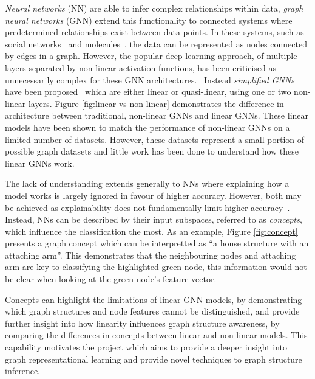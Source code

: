 \emph{Neural networks} (NN) are able to infer complex relationships within data, \emph{graph neural networks} (GNN) extend this functionality to connected systems where predetermined relationships exist between data points.
In these systems, such as social networks~\cite{pmlr-v70-gilmer17a} and molecules~\cite{DBLP:journals/corr/abs-1806-01973}, the data can be represented as nodes connected by edges in a graph.
However, the popular deep learning approach, of multiple layers separated by non-linear activation functions, has been criticised as unnecessarily complex for these GNN architectures.~\cite{wu2019simplifying}
Instead \emph{simplified GNNs} have been proposed~\cite{chanpuriya2022simplified,chien2020adaptive,wu2019simplifying} which are either linear or quasi-linear, using one or two non-linear layers.
Figure \ref{fig:linear-vs-non-linear} demonstrates the difference in architecture between traditional, non-linear GNNs and linear GNNs.
These linear models have been shown to match the performance of non-linear GNNs on a limited number of datasets.
However, these datasets represent a small portion of possible graph datasets and little work has been done to understand how these linear GNNs work.


The lack of understanding extends generally to NNs where explaining how a model works is largely ignored in favour of higher accuracy.
However, both may be achieved as explainability does not fundamentally limit higher accuracy~\cite{zarlenga2022concept}.
Instead, NNs can be described by their input subspaces, referred to as \emph{concepts}, which influence the classification the most.
As an example, Figure \ref{fig:concept} presents a graph concept which can be interpretted as ``a house structure with an attaching arm''.
This demonstrates that the neighbouring nodes and attaching arm are key to classifying the highlighted green node, this information would not be clear when looking at the green node's feature vector.

Concepts can highlight the limitations of linear GNN models, by demonstrating which graph structures and node features cannot be distinguished, and provide further insight into how linearity influences graph structure awareness, by comparing the differences in concepts between linear and non-linear models.
This capability motivates the project which aims to provide a deeper insight into graph representational learning and provide novel techniques to graph structure inference.

